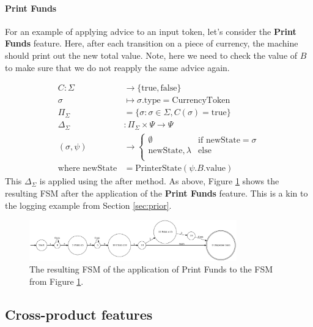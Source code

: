 \documentclass[sigplan,anonymous,review]{acmart}
\begin{document}
\paragraph{Print Funds} For an example of applying advice to an input token, let's consider the \textbf{Print Funds} feature. Here, after each transition on a piece of currency, the machine should print out the new total value. Note, here we need to check the value of $B$ to make sure that we do not reapply the same advice again.

\begin{align*}
C: \Sigma &\rightarrow \{\mathrm{true},\mathrm{false}\}\\
\sigma &\mapsto \sigma.\text{type} = \text{CurrencyToken} \\
\Pi_\Sigma &= \{\sigma: \sigma \in \Sigma, C(\sigma) = \mathrm{true}\}\\
\Delta_\Sigma &: \Pi_\Sigma \times \Psi \rightarrow \Psi\\
(\sigma, \psi) &\rightarrow \begin{cases}
    \emptyset & \text{if newState} = \sigma\\
    \text{newState}, \lambda & \text{else}\\
\end{cases}\\
\text{where newState} &= \text{PrinterState}(\psi.B.\text{value})
\end{align*}
This $\Delta_\Sigma$ is applied using the after method. As above, Figure \ref{fig:vend3} shows the resulting FSM after the application of the \textbf{Print Funds} feature. This is a kin to the logging example from Section \ref{sec:prior}.

\begin{figure}
    \centering
    \includegraphics[width=0.8\textwidth]{figures/vend3.pdf}
    \caption{The resulting FSM of the application of Print Funds to the FSM from Figure \ref{fig:vend3}.}
    \label{fig:vend3}
\end{figure}

\subsection{Cross-product features}\label{sec:cpalg}
\end{document}
